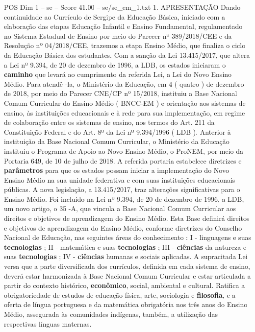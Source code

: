 \begin{textsample}{POS Dim 1 – se – Score 41.00 – se/se\_em\_1.txt}  \label{ex:f1_pos_089}
1.
APRESENTAÇÃO Dando continuidade ao Currículo de Sergipe da Educação Básica, iniciado com a elaboração das etapas Educação Infantil e Ensino Fundamental, regulamentado no Sistema Estadual de Ensino por meio do Parecer nº 389/2018/CEE e da Resolução nº 04/2018/CEE, trazemos a etapa Ensino Médio, que finaliza o ciclo da Educação Básica dos estudantes.
Com a sanção da Lei 13.415/2017, que altera a Lei nº 9.394, de 20 de dezembro de 1996, a LDB, os estados iniciaram o \textbf{caminho} que levará ao cumprimento da referida Lei, a Lei do Novo Ensino Médio.
Para atendê -la, o Ministério da Educação, em 4 ( quatro ) de dezembro de 2018, por meio do Parecer CNE/CP nº 15/2018, instituiu a Base Nacional Comum Curricular do Ensino Médio ( BNCC-EM ) e orientação aos sistemas de ensino, às instituições educacionais e à rede para sua implementação, em regime de colaboração entre os sistemas de ensino, nos termos do Art. 211 da Constituição Federal e do Art. 8º da Lei nº 9.394/1996 ( LDB ).
Anterior à instituição da Base Nacional Comum Curricular, o Ministério da Educação instituiu o Programa de Apoio ao Novo Ensino Médio, o ProNEM, por meio da Portaria 649, de 10 de julho de 2018.
A referida portaria estabelece diretrizes e \textbf{parâmetros} para que os estados possam iniciar a implementação do Novo Ensino Médio na sua unidade federativa e com suas instituições educacionais públicas.
A nova legislação, a 13.415/2017, traz alterações significativas para o Ensino Médio.
Foi incluído na Lei nº 9.394, de 20 de dezembro de 1996, a LDB, um novo artigo, o 35 -A, que vincula a Base Nacional Comum Curricular aos direitos e objetivos de aprendizagem do Ensino Médio.
Esta Base definirá direitos e objetivos de aprendizagem do Ensino Médio, conforme diretrizes do Conselho Nacional de Educação, nas seguintes áreas do conhecimento : I - linguagens e suas \textbf{tecnologias} ; II - matemática e suas \textbf{tecnologias} ; III - \textbf{ciências} da natureza e suas \textbf{tecnologias} ; IV - \textbf{ciências} humanas e sociais aplicadas.
A supracitada Lei versa que a parte diversificada dos currículos, definida em cada sistema de ensino, deverá estar harmonizada à Base Nacional Comum Curricular e estar articulada a partir do contexto histórico, \textbf{econômico}, social, ambiental e cultural.
Ratifica a obrigatoriedade de estudos de educação física, arte, sociologia e \textbf{filosofia}, e a oferta de língua portuguesa e da matemática obrigatória nos três anos do Ensino Médio, assegurada às comunidades indígenas, também, a utilização das respectivas línguas maternas.

\end{textsample}
